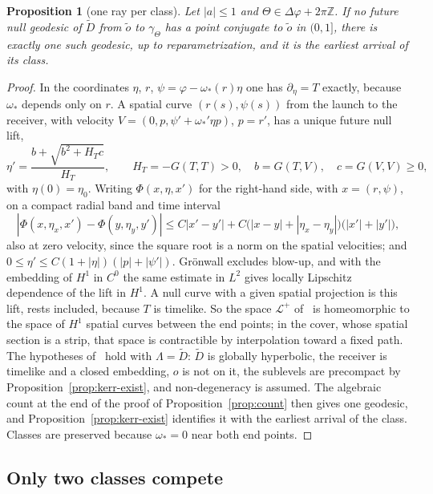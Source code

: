 \documentclass[aip,jmp,amsmath,amssymb,reprint]{revtex4-2}
\theoremstyle{plain}
\newtheorem{proposition}{Proposition}[section]
\theoremstyle{definition}
\begin{document}
\begin{proposition}[one ray per class]\label{prop:kerr-class}
Let $|a|\le1$ and $\Theta\in\Delta\varphi+2\pi\mathbb Z$. If no future null geodesic of $\tilde D$ from $\tilde o$ to $\gamma_\Theta$
has a point conjugate to $\tilde o$ in $(0,1]$, there is exactly one such geodesic, up to
reparametrization, and it is the earliest arrival of its class.
\end{proposition}

\begin{proof}
In the coordinates $\eta$, $r$, $\psi=\varphi-\omega_*(r)\eta$ one has $\partial_\eta=T$ exactly, because $\omega_*$ depends only
on $r$. A spatial curve $(r(s),\psi(s))$ from the launch to the receiver, with velocity
$V=(0,p,\psi'+\omega_*'\eta p)$, $p=r'$, has a unique future null lift,
\[
  \eta'=\frac{b+\sqrt{b^2+H_Tc}}{H_T},\qquad H_T=-G(T,T)>0,\quad b=G(T,V),\quad c=G(V,V)\ge0,
\]
with $\eta(0)=\eta_0$. Writing $\Phi(x,\eta,x')$ for the right-hand side, with $x=(r,\psi)$, on a compact radial band
and time interval
\[
  |\Phi(x,\eta_x,x')-\Phi(y,\eta_y,y')|\le C|x'-y'|+C\big(|x-y|+|\eta_x-\eta_y|\big)\big(|x'|+|y'|\big),
\]
also at zero velocity, since the square root is a norm on the spatial velocities; and
$0\le\eta'\le C(1+|\eta|)(|p|+|\psi'|)$. Gr\"onwall excludes blow-up, and with the embedding of $H^1$ in $C^0$ the
same estimate in $L^2$ gives locally Lipschitz dependence of the lift in $H^1$. A null curve with a given spatial projection is this
lift, rests included, because $T$ is timelike. So the space $\mathcal L^+$ of~\cite[(1.4)]{GiannoniMasielloPiccioneMorse}
is homeomorphic to the space of $H^1$ spatial curves between the end points; in the cover, whose
spatial section is a strip, that space is contractible by interpolation toward a fixed path. The
hypotheses of~\cite[Theorem~1.7]{GiannoniMasielloPiccioneMorse} hold with $\Lambda=\tilde D$: $\tilde D$ is globally hyperbolic,
the receiver is timelike and a closed embedding, $o$ is not on it, the sublevels are precompact by
Proposition~\ref{prop:kerr-exist}, and non-degeneracy is assumed. The algebraic count at the end of
the proof of Proposition~\ref{prop:count} then gives one geodesic, and Proposition~\ref{prop:kerr-exist}
identifies it with the earliest arrival of the class. Classes are preserved because $\omega_*=0$ near
both end points.
\end{proof}

\subsection{Only two classes compete}
\end{document}
